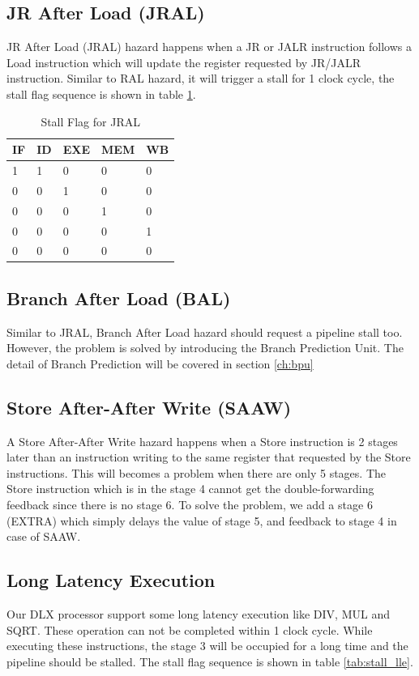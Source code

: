 \subsection[JR After Load (JRAL)]{JR After Load (JRAL)}
JR After Load (JRAL) hazard happens when a JR or JALR instruction follows a Load
instruction which will update the register requested by JR/JALR instruction. Similar
to RAL hazard, it will trigger a stall for 1 clock cycle, the stall flag sequence is
shown in table \ref{tab:stall_jral}.

\begin{table}[!ht]
\centering
\caption{Stall Flag for JRAL}
\label{tab:stall_jral}
\begin{tabular}{|l|l|l|l|l|}
\hline
IF & ID & EXE & MEM & WB \\
\hline
1  & 1  & 0  & 0  & 0\\
0  & 0  & 1  & 0  & 0\\
0  & 0  & 0  & 1  & 0\\
0  & 0  & 0  & 0  & 1\\
0  & 0  & 0  & 0  & 0 \\
\hline
\end{tabular}
\end{table}

\subsection[Branch After Load (BAL)]{Branch After Load (BAL)}
Similar to JRAL, Branch After Load hazard should request a pipeline stall too. However,
the problem is solved by introducing the Branch Prediction Unit. The
detail of Branch Prediction will be covered in section \ref{ch:bpu}

\subsection[Store After-After Write (SAAW)]{Store After-After Write (SAAW)}
A Store After-After Write hazard happens when a Store instruction is 2 stages later than
an instruction writing to the same register that requested by the Store instructions.
This will becomes a problem when there are only 5 stages. The Store instruction which
is in the stage 4 cannot get the double-forwarding feedback since there is no stage 6.
To solve the problem, we add a stage 6 (EXTRA) which simply delays the value of stage 5,
and feedback to stage 4 in case of SAAW.

\subsection[Long Latency Execution]{Long Latency Execution}
Our DLX processor support some long latency execution like DIV, MUL and SQRT. These
operation can not be completed within 1 clock cycle. While executing these instructions,
the stage 3 will be occupied for a long time and the pipeline should be stalled.
The stall flag sequence is shown in table \ref{tab:stall_lle}.


